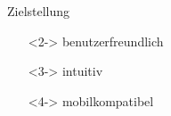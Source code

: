 \begin{frame}{Zielstellung}
\begin{itemize}
	\centering
	\item[]<2-> benutzerfreundlich
	\item[]<3-> intuitiv
	\item[]<4-> mobilkompatibel
\end{itemize}
\end{frame}
